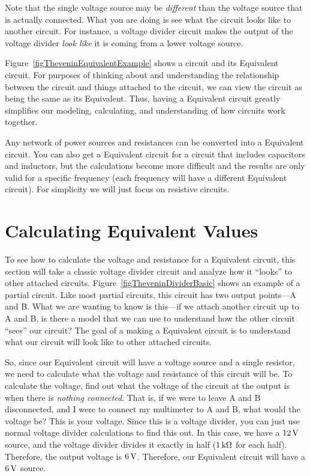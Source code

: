 Note that the single voltage source may be \emph{different} than the voltage source that is actually connected.
What you are doing is see what the circuit looks like to another circuit.
For instance, a voltage divider circuit makes the output of the voltage divider \emph{look like} it is coming from a lower voltage source.

Figure~\ref{figTheveninEquivalentExample} shows a circuit and its \thev Equivalent circuit.
For purposes of thinking about and understanding the relationship between the circuit and things attached to the circuit, we can view the circuit as being the same as its \thev Equivalent.
Thus, having a \thev Equivalent circuit greatly simplifies our modeling, calculating, and understanding of how circuits work together.

Any network of power sources and resistances can be converted into a \thev Equivalent circuit.
You can also get a \thev Equivalent circuit for a circuit that includes capacitors and inductors, but the calculations become more difficult and the results are only valid for a specific frequency (each frequency will have a different \thev Equivalent circuit).
For simplicity we will just focus on resistive circuits.

\section{Calculating \thev  Equivalent Values}



To see how to calculate the voltage and resistance for a \thev Equivalent circuit, this section will take a classic voltage divider circuit and analyze how it ``looks'' to other attached circuits.
Figure~\ref{figTheveninDividerBasic} shows an example of a partial circuit.
Like most partial circuits, this circuit has two output points---A and B.
What we are wanting to know is this---if we attach another circuit up to A and B, is there a model that we can use to understand how the other circuit ``sees'' our circuit?
The goal of a making a \thev Equivalent circuit is to understand what our circuit will look like to other attached circuits.

So, since our \thev Equivalent circuit will have a voltage source and a single resistor, we need to calculate what the voltage and resistance of this circuit will be.
To calculate the voltage, find out what the voltage of the circuit at the output is when there is \emph{nothing connected}.
That is, if we were to leave A and B disconnected, and I were to connect my multimeter to A and B, what would the voltage be?
This is your \thev voltage.
Since this is a voltage divider, you can just use normal voltage divider calculations to find this out.
In this case, we have a $12\,\si{\volt}$ source, and the voltage divider divides it exactly in half ($1\,\si{\kilo\ohm}$ for each half).
Therefore, the output voltage is $6\,\si{\volt}$.  
Therefore, our \thev Equivalent circuit will have a $6\,\si{\volt}$ source.

